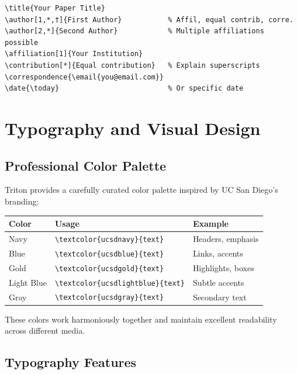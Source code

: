 \documentclass{triton}
\begin{document}
\begin{tcolorbox}[colback=ucsdblue!8,colframe=ucsdblue,title=Essential Metadata Commands]
\begin{verbatim}
\title{Your Paper Title}
\author[1,*,†]{First Author}           % Affil, equal contrib, corre.
\author[2,*]{Second Author}            % Multiple affiliations possible
\affiliation[1]{Your Institution}
\contribution[*]{Equal contribution}   % Explain superscripts
\correspondence{\email{you@email.com}}
\date{\today}                          % Or specific date
\end{verbatim}
\end{tcolorbox}

\section{Typography and Visual Design}

\subsection{Professional Color Palette}

Triton provides a carefully curated color palette inspired by UC San Diego's branding:

\begin{center}
\begin{tabular}{@{}lll@{}}
\toprule
\textbf{Color} & \textbf{Usage} & \textbf{Example} \\
\midrule
\textcolor{ucsdnavy}{Navy} & \verb|\textcolor{ucsdnavy}{text}| & Headers, emphasis \\
\textcolor{ucsdblue}{Blue} & \verb|\textcolor{ucsdblue}{text}| & Links, accents \\
\textcolor{ucsdgold}{Gold} & \verb|\textcolor{ucsdgold}{text}| & Highlights, boxes \\
\textcolor{ucsdlightblue}{Light Blue} & \verb|\textcolor{ucsdlightblue}{text}| & Subtle accents \\
\textcolor{ucsdgray}{Gray} & \verb|\textcolor{ucsdgray}{text}| & Secondary text \\
\bottomrule
\end{tabular}
\end{center}

These colors work harmoniously together and maintain excellent readability across different media.

\subsection{Typography Features}
\end{document}
